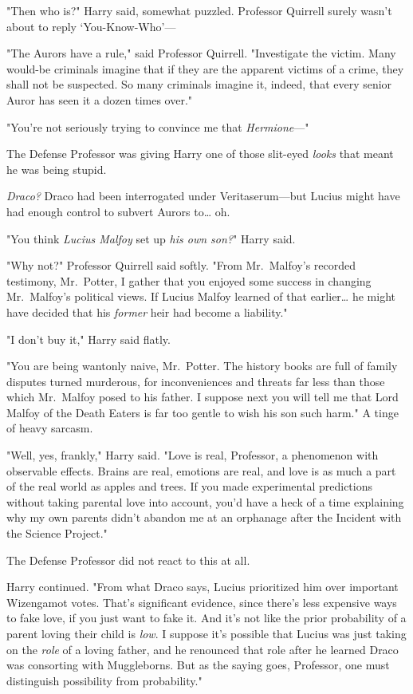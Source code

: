 "Then who is?" Harry said, somewhat puzzled. Professor Quirrell surely wasn't 
about to reply `You-Know-Who'---

"The Aurors have a rule," said Professor Quirrell. "Investigate the victim. 
Many would-be criminals imagine that if they are the apparent victims of a 
crime, they shall not be suspected. So many criminals imagine it, indeed, that 
every senior Auror has seen it a dozen times over."

"You're not seriously trying to convince me that \emph{Hermione}---"

The Defense Professor was giving Harry one of those slit-eyed \emph{looks} that 
meant he was being stupid.

\emph{Draco?} Draco had been interrogated under Veritaserum---but Lucius might 
have had enough control to subvert Aurors to{\ldots} oh.

"You think \emph{Lucius Malfoy} set up \emph{his own son?}" Harry said.

"Why not?" Professor Quirrell said softly. "From Mr.~Malfoy's recorded 
testimony, Mr.~Potter, I gather that you enjoyed some success in changing 
Mr.~Malfoy's political views. If Lucius Malfoy learned of that earlier{\ldots} 
he might have decided that his \emph{former} heir had become a liability."

"I don't buy it," Harry said flatly.

"You are being wantonly naive, Mr.~Potter. The history books are full of family 
disputes turned murderous, for inconveniences and threats far less than those 
which Mr.~Malfoy posed to his father. I suppose next you will tell me that Lord 
Malfoy of the Death Eaters is far too gentle to wish his son such harm." A 
tinge of heavy sarcasm.

"Well, yes, frankly," Harry said. "Love is real, Professor, a phenomenon with 
observable effects. Brains are real, emotions are real, and love is as much a 
part of the real world as apples and trees. If you made experimental 
predictions without taking parental love into account, you'd have a heck of a 
time explaining why my own parents didn't abandon me at an orphanage after the 
Incident with the Science Project."

The Defense Professor did not react to this at all.

Harry continued. "From what Draco says, Lucius prioritized him over important 
Wizengamot votes. That's significant evidence, since there's less expensive 
ways to fake love, if you just want to fake it. And it's not like the prior 
probability of a parent loving their child is \emph{low}. I suppose it's 
possible that Lucius was just taking on the \emph{role} of a loving father, and 
he renounced that role after he learned Draco was consorting with Muggleborns. 
But as the saying goes, Professor, one must distinguish possibility from 
probability."

